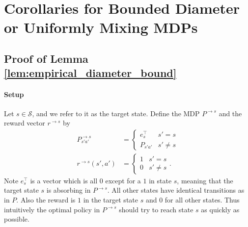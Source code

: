 \documentclass{article}
\theoremstyle{plain}
\theoremstyle{plain}
\theoremstyle{remark}
\theoremstyle{plain}
\theoremstyle{plain}
\renewcommand{\S}{\mathcal{S}}
\begin{document}
\section{Corollaries for Bounded Diameter or Uniformly Mixing MDPs}
\label{sec:opt_diam_tmix_cors}

\subsection{Proof of Lemma \ref{lem:empirical_diameter_bound}}
\label{sec:empirical_diam_bound_pf}

\paragraph{Setup}
Let $s \in \S$, and we refer to it as the target state. Define the MDP $P^{\to s}$ and the reward vector $r^{\to s}$ by
\begin{align*}
        P^{\to s}_{s'a'} &= \begin{cases}
            e_{s}^\top & s' = s \\
            P_{s'a'} &  s' \neq s
        \end{cases} \\
        r^{\to s}(s',a') &= \begin{cases}
            1 & s' = s \\
            0 &  s' \neq s
        \end{cases}.
\end{align*}
    Note $e_{s}^\top$ is a vector which is all $0$ except for a $1$ in state $s$, meaning that the target state $s$ is absorbing in $P^{\to s}$. All other states have identical transitions as in $P$. Also the reward is $1$ in the target state $s$ and $0$ for all other states. Thus intuitively the optimal policy in $P^{\to s}$ should try to reach state $s$ as quickly as possible.
\end{document}
